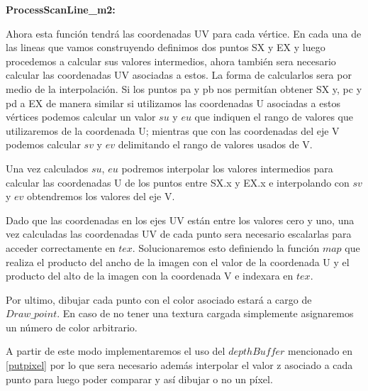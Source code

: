 \documentclass[a4paper]{article}
\newcounter{col}
\begin{document}
\textbf{ProcessScanLine\_m2:} 


Ahora esta función tendrá las coordenadas UV para cada vértice. En cada una de las lineas que vamos construyendo definimos dos puntos SX y EX y luego procedemos a calcular sus valores intermedios, ahora también sera necesario calcular las coordenadas UV asociadas a estos. La forma de calcularlos sera por medio de la interpolación. Si los puntos pa y pb nos permitían obtener SX y, pc y pd a EX de manera similar si utilizamos las coordenadas U asociadas a estos vértices podemos calcular un valor $su$ y $eu$ que indiquen el rango de valores que utilizaremos de la coordenada U; mientras que con las coordenadas del eje V podemos calcular $sv$ y $ev$ delimitando el rango de valores usados de V.
\par Una vez calculados $su$, $eu$ podremos interpolar los valores intermedios para calcular las coordenadas U de los puntos entre SX.x y EX.x e interpolando con $sv$ y $ev$ obtendremos los valores del eje V.
\par Dado que las coordenadas en los ejes UV están entre los valores cero y uno, una vez calculadas las coordenadas UV de cada punto sera necesario escalarlas para acceder correctamente en $tex$. Solucionaremos esto definiendo la función $map$ que realiza el producto del ancho de la imagen con el valor de la coordenada U y el producto del alto de la imagen con la coordenada V e indexara en $tex$.
\par Por ultimo, dibujar cada punto con el color asociado estará a cargo de $Draw\_point$. En caso de no tener una textura cargada simplemente asignaremos un número de color arbitrario.  
\par A partir de este modo implementaremos el uso del $depthBuffer$ mencionado en \ref{putpixel} por lo que sera necesario además interpolar el valor z asociado a cada punto para luego poder comparar y así dibujar o no un píxel.
 
\end{document}
